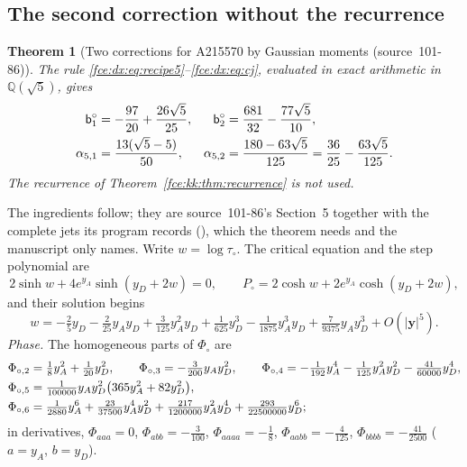\documentclass[11pt,a4paper]{article}
\numberwithin{equation}{section}
\newtheorem{theorem}{Theorem}[section]
\theoremstyle{definition}\newtheorem{definition}[theorem]{Definition}
\theoremstyle{remark}\newtheorem{remark}[theorem]{Remark}
\newcommand{\Q}{\mathbb Q}
\begin{document}
\subsection{The second correction without the recurrence}\label{fce:dx:sec:alpha52}
\begin{theorem}[Two corrections for A215570 by Gaussian moments (source~101-86)]\label{fce:dx:thm:alpha52}
The rule \eqref{fce:dx:eq:recipe5}--\eqref{fce:dx:eq:cj}, evaluated in exact
arithmetic in $\Q(\sqrt5)$, gives
\begin{align}
 \mathsf b^\circ_1&=-\frac{97}{20}+\frac{26\sqrt5}{25},&
 \mathsf b^\circ_2&=\frac{681}{32}-\frac{77\sqrt5}{10},\notag\\
 \alpha_{5,1}&=\frac{13(\sqrt5-5)}{50},&
 \alpha_{5,2}&=\frac{180-63\sqrt5}{125}=\frac{36}{25}-\frac{63\sqrt5}{125}.
 \label{fce:dx:eq:alpha52}
\end{align}
The recurrence of Theorem~\ref{fce:kk:thm:recurrence} is not used.
\end{theorem}
The ingredients follow; they are source~101-86's Section~5 together with the
complete jets its program records (),
which the theorem needs and the manuscript only names. Write $w=\log\tau_\circ$.
The critical equation and the step polynomial are
\[
 2\sinh w+4e^{y_A}\sinh(y_D+2w)=0,\qquad
 P_\circ=2\cosh w+2e^{y_A}\cosh(y_D+2w),
\]
and their solution begins
\[
 w=-\tfrac25y_D-\tfrac2{25}y_Ay_D+\tfrac3{125}y_A^2y_D+\tfrac1{625}y_D^3
 -\tfrac1{1875}y_A^3y_D+\tfrac7{9375}y_Ay_D^3+O(|\boldsymbol y|^5).
\]
\emph{Phase.} The homogeneous parts of $\Phi_\circ$ are
\begin{align}\label{fce:dx:eq:phasejets}
 \Phi_{\circ,2}&=\tfrac18y_A^2+\tfrac1{20}y_D^2,\qquad
 \Phi_{\circ,3}=-\tfrac3{200}y_Ay_D^2,\qquad
 \Phi_{\circ,4}=-\tfrac1{192}y_A^4-\tfrac1{125}y_A^2y_D^2-\tfrac{41}{60000}y_D^4,\notag\\
 \Phi_{\circ,5}&=\tfrac1{100000}y_Ay_D^2\bigl(365y_A^2+82y_D^2\bigr),\notag\\
 \Phi_{\circ,6}&=\tfrac1{2880}y_A^6+\tfrac{23}{37500}y_A^4y_D^2
 +\tfrac{217}{1200000}y_A^2y_D^4+\tfrac{293}{22500000}y_D^6 ;
\end{align}
in derivatives, $\Phi_{aaa}=0$, $\Phi_{abb}=-\frac3{100}$,
$\Phi_{aaaa}=-\frac18$, $\Phi_{aabb}=-\frac4{125}$, $\Phi_{bbbb}=-\frac{41}{2500}$
($a=y_A$, $b=y_D$).
\end{document}
